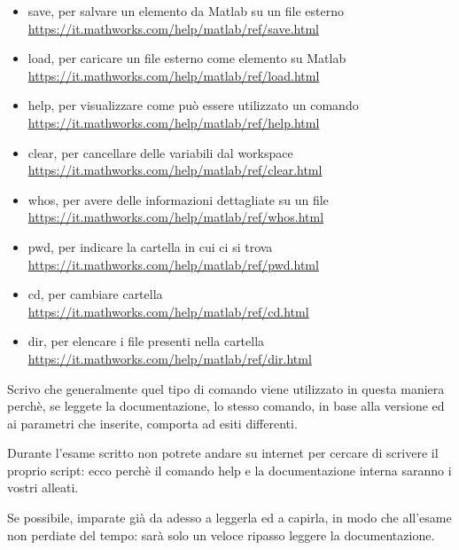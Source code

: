 \begin{itemize}
    \item save, per salvare un elemento da Matlab su un file esterno \\ \url{https://it.mathworks.com/help/matlab/ref/save.html} 
    \item load, per caricare un file esterno come elemento su Matlab \\ \url{https://it.mathworks.com/help/matlab/ref/load.html} 
    \item help, per visualizzare come può essere utilizzato un comando \\ \url{https://it.mathworks.com/help/matlab/ref/help.html} 
    \item clear, per cancellare delle variabili dal workspace \\ \url{https://it.mathworks.com/help/matlab/ref/clear.html} 
    \item whos, per avere delle informazioni dettagliate su un file \\ \url{https://it.mathworks.com/help/matlab/ref/whos.html} 
    \item pwd, per indicare la cartella in cui ci si trova \\ \url{https://it.mathworks.com/help/matlab/ref/pwd.html}  
    \item cd, per cambiare cartella \\ \url{https://it.mathworks.com/help/matlab/ref/cd.html} 
    \item dir, per elencare i file presenti nella cartella \\ \url{https://it.mathworks.com/help/matlab/ref/dir.html}
\end{itemize}

\begin{tcolorbox}
    Scrivo che generalmente quel tipo di comando viene utilizzato in questa maniera perchè, 
    se leggete la documentazione, lo stesso comando, in base alla versione ed ai parametri che inserite, 
    comporta ad esiti differenti. \newline 

    Durante l'esame scritto non potrete andare su internet per cercare di scrivere il proprio script: 
    ecco perchè il comando help e la documentazione interna saranno i vostri alleati. \newline 

    Se possibile, imparate già da adesso a leggerla ed a capirla, in modo che all'esame non perdiate del tempo: sarà solo un veloce ripasso leggere la documentazione.  
\end{tcolorbox} 

